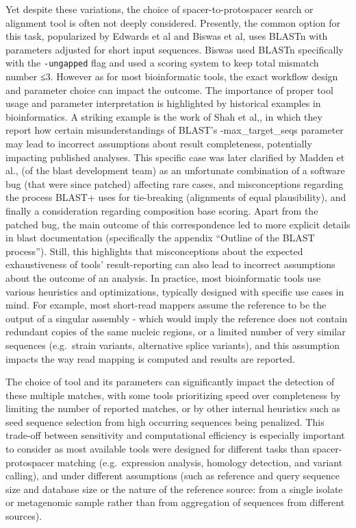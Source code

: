 \documentclass[
]{article}
\begin{document}
Yet despite these variations, the choice of spacer-to-protospacer search
or alignment tool is often not deeply considered. Presently, the common
option for this task, popularized by Edwards et al and Biswas et
al\autocite{Edwards2015_phage_host,Biswas2013}, uses
BLASTn\autocite{Altschul1990_blast} with parameters adjusted for short
input sequences. Biswas used BLASTn specifically with the
\texttt{-ungapped} flag and used a scoring system to keep total mismatch
number ≤3. However as for most bioinformatic tools, the exact workflow
design and parameter choice can impact the outcome. The importance of
proper tool usage and parameter interpretation is highlighted by
historical examples in bioinformatics. A striking example is the work of
Shah et al,\autocite{Shah2018}, in which they report how certain
misunderstandings of BLAST's -max\_target\_seqs parameter may lead to
incorrect assumptions about result completeness, potentially impacting
published analyses. This specific case was later clarified by Madden et
al.,\autocite{Madden2018} (of the blast development team) as an
unfortunate combination of a software bug (that were since patched)
affecting rare cases, and misconceptions regarding the process BLAST+
uses for tie-breaking (alignments of equal plausibility), and finally a
consideration regarding composition base scoring. Apart from the patched
bug, the main outcome of this correspondence led to more explicit
details in blast documentation (specifically the appendix ``Outline of
the BLAST process''). Still, this highlights that misconceptions about
the expected exhaustiveness of tools' result-reporting can also lead to
incorrect assumptions about the outcome of an analysis. In practice,
most bioinformatic tools use various heuristics and optimizations,
typically designed with specific use cases in mind. For example, most
short-read mappers assume the reference to be the output of a singular
assembly - which would imply the reference does not contain redundant
copies of the same nucleic regions, or a limited number of very similar
sequences (e.g.~strain variants, alternative splice variants), and this
assumption impacts the way read mapping is computed and results are
reported.

The choice of tool and its parameters can significantly impact the
detection of these multiple matches, with some tools prioritizing speed
over completeness by limiting the number of reported matches, or by
other internal heuristics such as seed sequence selection from high
occurring sequences being penalized. This trade-off between sensitivity
and computational efficiency is especially important to consider as most
available tools were designed for different tasks than
spacer-protospacer matching (e.g.~expression analysis, homology
detection, and variant calling), and under different assumptions (such
as reference and query sequence size and database size or the nature of
the reference source: from a single isolate or metagenomic sample rather
than from aggregation of sequences from different sources).
\end{document}
